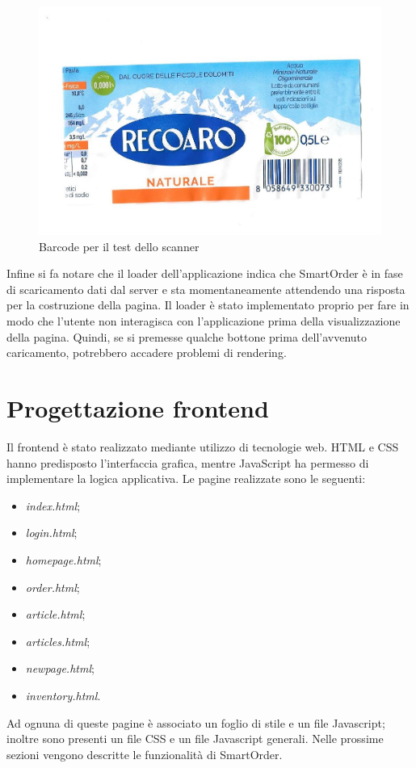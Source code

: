 \documentclass[12pt, a4paper, titlepage]{report}
\begin{document}
	\begin{figure}[H] 
		\centering
		\includegraphics[width=0.8\columnwidth]{img/barcode}
		\caption{Barcode per il test dello scanner}
		\label{fig:code}
	\end{figure}
	
	\noindent Infine si fa notare che il loader dell'applicazione indica che SmartOrder è in fase di scaricamento dati dal server e sta momentaneamente attendendo una risposta per la costruzione della pagina. Il loader è stato implementato proprio per fare in modo che l'utente non interagisca con l'applicazione prima della visualizzazione della pagina. Quindi, se si premesse qualche bottone prima dell'avvenuto caricamento, potrebbero accadere problemi di rendering.
	
	\section{Progettazione frontend}
	
	Il frontend è stato realizzato mediante utilizzo di tecnologie web. HTML e CSS hanno predisposto l'interfaccia grafica, mentre JavaScript ha permesso di implementare la logica applicativa.
	Le pagine realizzate sono le seguenti:
	\begin{itemize}
		\item \textit{index.html};
		\item \textit{login.html};
		\item \textit{homepage.html};
		\item \textit{order.html};
		\item \textit{article.html};
		\item \textit{articles.html};
		\item \textit{newpage.html};
		\item \textit{inventory.html}.
	\end{itemize}
	Ad ognuna di queste pagine è associato un foglio di stile e un file Javascript; inoltre sono presenti un file CSS e un file Javascript generali. Nelle prossime sezioni vengono descritte le funzionalità di SmartOrder.
	
\end{document}
